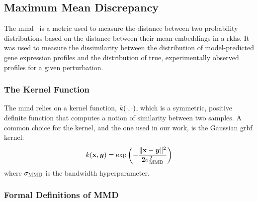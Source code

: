 \subsection{Maximum Mean Discrepancy}
\label{app:metrics:mmd}

The \gls{mmd}~\citep{gretton2012kernel} is a metric used to measure the distance between two probability distributions based on the distance between their mean embeddings in a \gls{rkhs}.
It was used to measure the dissimilarity between the distribution of model-predicted gene expression profiles and the distribution of true, experimentally observed profiles for a given perturbation.

\subsubsection{The Kernel Function}
\label{app:metrics:mmd:kernel}

The \gls{mmd} relies on a kernel function, $k(\cdot, \cdot)$, which is a symmetric, positive definite function that computes a notion of similarity between two samples.
A common choice for the kernel, and the one used in our work, is the Gaussian \gls{grbf} kernel:
\begin{equation}
    k({\mathbf{x}}, {\bm{y}}) = \exp\left(-\frac{\|{\mathbf{x}} - {\bm{y}}\|^2}{2\sigma_{\text{MMD}}^2}\right)
    \label{eq:app:kernel_rbf}
\end{equation}
where $\sigma_{\text{MMD}}$ is the bandwidth hyperparameter.

\subsubsection{Formal Definitions of MMD}
\label{app:metrics:mmd:definitions}

